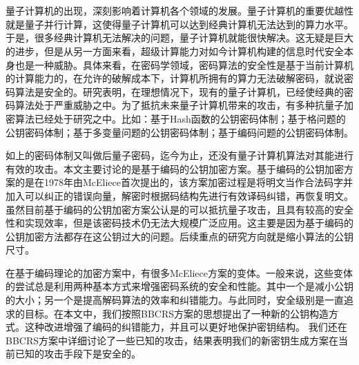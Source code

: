 \vspace{-2.5cm}
\chapter*{}
\vspace{-1cm}
量子计算机的出现，深刻影响着计算机各个领域的发展。量子计算机的重要优越性就是量子并行计算，这使得量子计算机可以达到经典计算机无法达到的算力水平。于是，很多经典计算机无法解决的问题，量子计算机就能很快解决。这无疑是巨大的进步，但是从另一方面来看，超级计算能力对如今计算机构建的信息时代安全本身也是一种威胁。具体来看，在密码学领域，密码算法的安全性是基于当前计算机的计算能力的，在允许的破解成本下，计算机所拥有的算力无法破解密码，就说密码算法是安全的。研究表明，在理想情况下，现有的量子计算机，已经使经典的密码算法处于严重威胁之中。为了抵抗未来量子计算机带来的攻击，有多种抗量子加密算法已经处于研究之中。比如：基于Hash函数的公钥密码体制；基于格问题的公钥密码体制；基于多变量问题的公钥密码体制；基于编码问题的公钥密码体制。

如上的密码体制又叫做后量子密码，迄今为止，还没有量子计算机算法对其能进行有效的攻击。本文主要讨论的是基于编码的公钥加密方案。基于编码的公钥加密方案的是在1978年由McEliece首次提出的\cite{Mceliece1978A}，该方案加密过程是将明文当作合法码字并加入可以纠正的错误向量，解密时根据码结构先进行有效译码纠错，再恢复明文。虽然目前基于编码的公钥加密方案公认是的可以抵抗量子攻击，且具有较高的安全性和实现效率，但是该密码技术仍无法大规模广泛应用。这主要是因为基于编码的公钥加密方法都存在这公钥过大的问题。后续重点的研究方向就是缩小算法的公钥尺寸。

在基于编码理论的加密方案中，有很多McEliece方案的变体\cite{Loidreau2001Weak, Berger2009Reducing}。一般来说，这些变体的尝试总是利用两种基本方式来增强密码系统的安全和性能。其中一个是减小公钥的大小；另一个是提高解码算法的效率和纠错能力。与此同时，安全级别是一直追求的目标。在本文中，我们按照BBCRS方案\cite{Baldi2011EnhancedPK}的思想提出了一种新的公钥构造方式。这种改进增强了编码的纠错能力，并且可以更好地保护密钥结构。 我们还在BBCRS方案中详细讨论了一些已知的攻击，结果表明我们的新密钥生成方案在当前已知的攻击手段下是安全的。


\hspace{-0.5cm}
 
